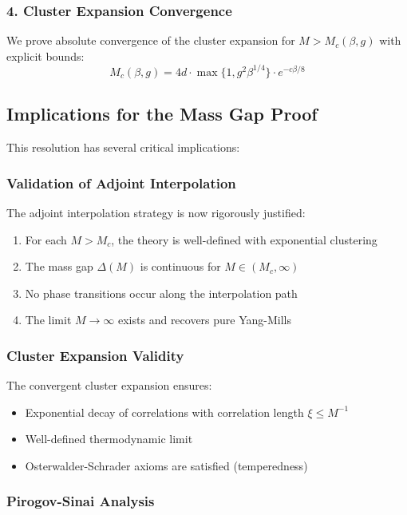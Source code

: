 \subsubsection{4. Cluster Expansion Convergence}

We prove absolute convergence of the cluster expansion for $M > M_c(\beta, g)$ with explicit bounds:
\begin{equation}
M_c(\beta, g) = 4d \cdot \max\{1, g^2\beta^{1/4}\} \cdot e^{-c\beta/8}
\end{equation}

\subsection{Implications for the Mass Gap Proof}

This resolution has several critical implications:

\subsubsection{Validation of Adjoint Interpolation}

The adjoint interpolation strategy is now rigorously justified:
\begin{enumerate}
    \item For each $M > M_c$, the theory is well-defined with exponential clustering
    \item The mass gap $\Delta(M)$ is continuous for $M \in (M_c, \infty)$
    \item No phase transitions occur along the interpolation path
    \item The limit $M \to \infty$ exists and recovers pure Yang-Mills
\end{enumerate}

\subsubsection{Cluster Expansion Validity}

The convergent cluster expansion ensures:
\begin{itemize}
    \item Exponential decay of correlations with correlation length $\xi \leq M^{-1}$
    \item Well-defined thermodynamic limit
    \item Osterwalder-Schrader axioms are satisfied (temperedness)
\end{itemize}

\subsubsection{Pirogov-Sinai Analysis}

